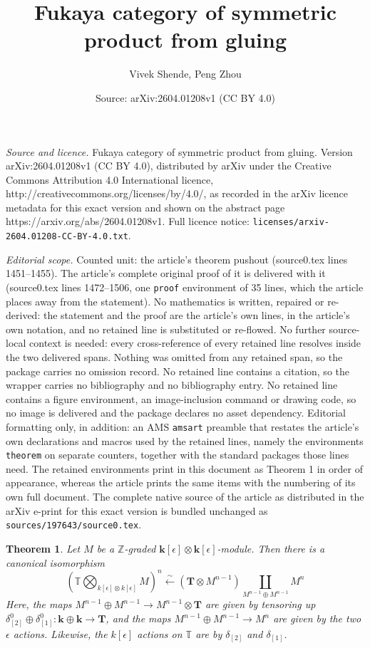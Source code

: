\documentclass[10pt,a4paper]{amsart}
\title{Fukaya category of symmetric product from gluing}
\author{Vivek Shende, Peng Zhou}
\date{Source: arXiv:2604.01208v1 (CC BY 4.0)}
\newtheorem{theorem}{Theorem}
\def\Z{\mathbb{Z}}
\begin{document}
\maketitle

\noindent\emph{Source and licence.} Fukaya category of symmetric product from gluing. Version arXiv:2604.01208v1 (CC BY 4.0), distributed by arXiv under the Creative Commons Attribution 4.0 International licence, http://creativecommons.org/licenses/by/4.0/, as recorded in the arXiv licence metadata for this exact version and shown on the abstract page https://arxiv.org/abs/2604.01208v1. Full licence notice: \texttt{licenses/arxiv-2604.01208-CC-BY-4.0.txt}.\par\smallskip

\noindent\textit{Editorial scope.} Counted unit: the article's theorem pushout (source0.tex lines 1451--1455). The article's complete original proof of it is delivered with it (source0.tex lines 1472--1506, one \texttt{proof} environment of 35 lines, which the article places away from the statement). No mathematics is written, repaired or re-derived: the statement and the proof are the article's own lines, in the article's own notation, and no retained line is substituted or re-flowed.  No further source-local context is needed: every cross-reference of every retained line resolves inside the two delivered spans.  Nothing was omitted from any retained span, so the package carries no omission record.  No retained line contains a citation, so the wrapper carries no bibliography and no bibliography entry.  No retained line contains a figure environment, an image-inclusion command or drawing code, so no image is delivered and the package declares no asset dependency.  Editorial formatting only, in addition: an AMS \texttt{amsart} preamble that restates the article's own declarations and macros used by the retained lines, namely the environments \texttt{theorem} on separate counters, together with the standard packages those lines need.  The retained environments print in this document as Theorem 1 in order of appearance, whereas the article prints the same items with the numbering of its own full document.  The complete native source of the article as distributed in the arXiv e-print for this exact version is bundled unchanged as \texttt{sources/197643/source0.tex}.
\begin{theorem} \label{thm:tensor to pushout}
Let $M$ be a $\Z$-graded $\mathbf{k}[\epsilon] \otimes \mathbf{k}[\epsilon]$-module.  Then there is a canonical isomorphism
$$\left(\mathbb{T} \bigotimes_{k[\epsilon] \otimes k[\epsilon]} M\right)^n \xleftarrow{\sim} ( \mathbf{T} \otimes M^{n-1}) \!\!\!\!\! \coprod_{M^{n-1} \oplus M^{n-1}} \!\!\!\!\! M^n$$
Here, the maps $M^{n-1} \oplus M^{n-1} \to M^{n-1} \otimes \mathbf{T}$ are given by tensoring up  $\delta^0_{[2]} \oplus \delta^0_{[1]}: \mathbf{k} \oplus \mathbf{k} \to \mathbf{T}$, and the maps $M^{n-1} \oplus M^{n-1} \to M^n$ are given by the two $\epsilon$ actions.  Likewise, the $k[\epsilon]$ actions on $\mathbb{T}$ are by $\delta_{[2]}$ and $\delta_{[1]}$. 
\end{theorem}
\end{document}
